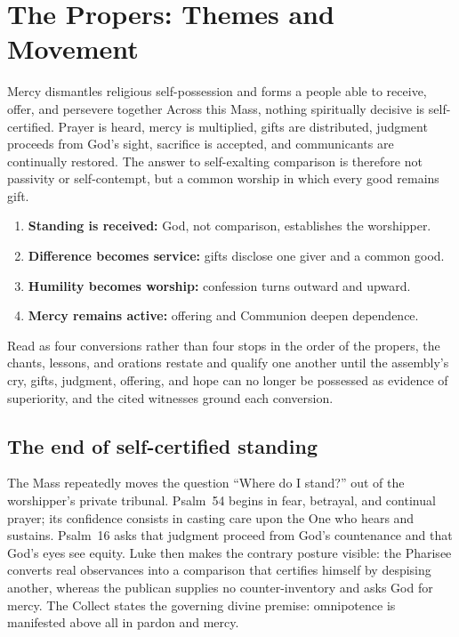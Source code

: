\section*{The Propers: Themes and Movement}
\label{triptych:brief-synthesis:start}

\begin{massbox}{Mercy dismantles religious self-possession and forms a people able to receive, offer, and persevere together}
Across this Mass, nothing spiritually decisive is self-certified.  Prayer is
heard, mercy is multiplied, gifts are distributed, judgment proceeds from
God's sight, sacrifice is accepted, and communicants are continually restored.
The answer to self-exalting comparison is therefore not passivity or
self-contempt, but a common worship in which every good remains gift.
\end{massbox}

\begin{enumerate}[leftmargin=1.5em,itemsep=0.1em]
\item \textbf{Standing is received:} God, not comparison, establishes the worshipper.
\item \textbf{Difference becomes service:} gifts disclose one giver and a common good.
\item \textbf{Humility becomes worship:} confession turns outward and upward.
\item \textbf{Mercy remains active:} offering and Communion deepen dependence.
\end{enumerate}

\noindent Read as four conversions rather than four stops in the order of the
propers, the chants, lessons, and orations restate and qualify one another
until the assembly's cry, gifts, judgment, offering, and hope can no longer be
possessed as evidence of superiority, and the cited witnesses ground each
conversion.

\subsection*{The end of self-certified standing}

The Mass repeatedly moves the question ``Where do I stand?'' out of the
worshipper's private tribunal.  Psalm~54 begins in fear, betrayal, and
continual prayer; its confidence consists in casting care upon the One who
hears and sustains.  Psalm~16 asks that judgment proceed from God's
countenance and that God's eyes see equity.  Luke then makes the contrary
posture visible: the Pharisee converts real observances into a comparison
that certifies himself by despising another, whereas the publican supplies no
counter-inventory and asks God for mercy.  The Collect states the governing
divine premise: omnipotence is manifested above all in pardon and mercy.

